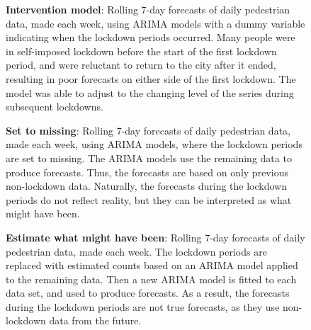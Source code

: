 \documentclass[
  11pt,
  a4paper,
]{article}
\begin{document}
\begin{figure}


\caption{\label{fig-walkers-plot2}\textbf{Intervention model}: Rolling
7-day forecasts of daily pedestrian data, made each week, using ARIMA
models with a dummy variable indicating when the lockdown periods
occurred. Many people were in self-imposed lockdown before the start of
the first lockdown period, and were reluctant to return to the city
after it ended, resulting in poor forecasts on either side of the first
lockdown. The model was able to adjust to the changing level of the
series during subsequent lockdowns.}

\end{figure}%

\begin{figure}


\caption{\label{fig-walkers-plot3}\textbf{Set to missing}: Rolling 7-day
forecasts of daily pedestrian data, made each week, using ARIMA models,
where the lockdown periods are set to missing. The ARIMA models use the
remaining data to produce forecasts. Thus, the forecasts are based on
only previous non-lockdown data. Naturally, the forecasts during the
lockdown periods do not reflect reality, but they can be interpreted as
what might have been.}

\end{figure}%

\begin{figure}


\caption{\label{fig-walkers-plot4}\textbf{Estimate what might have
been}: Rolling 7-day forecasts of daily pedestrian data, made each week.
The lockdown periods are replaced with estimated counts based on an
ARIMA model applied to the remaining data. Then a new ARIMA model is
fitted to each data set, and used to produce forecasts. As a result, the
forecasts during the lockdown periods are not true forecasts, as they
use non-lockdown data from the future.}

\end{figure}%
\end{document}
